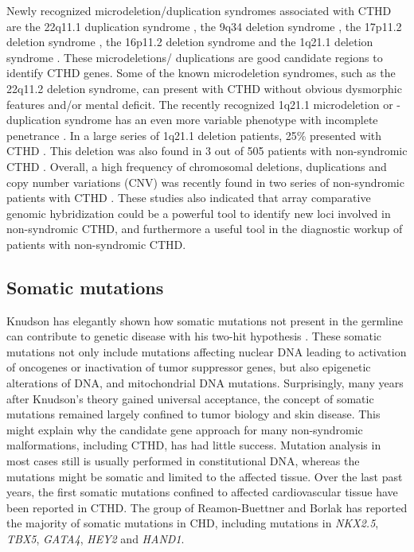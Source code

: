\begin{refsection}
\begin{sloppypar} Newly recognized microdeletion/duplication syndromes associated with CTHD are the 22q11.1 duplication syndrome \cite{wentzel2008clinical}, the 9q34 deletion syndrome \cite{stewart2007chromosome}, the 17p11.2 deletion syndrome \cite{andrieux2007genotype}, the 16p11.2 deletion syndrome \cite{brunetti2008recurrent,hernando2002comparative} and the 1q21.1 deletion syndrome \cite{brunetti2008recurrent,mefford2008recurrent,christiansen2004chromosome}. These microdeletions/ duplications are good candidate regions to identify CTHD genes. Some of the known microdeletion syndromes, such as the 22q11.2 deletion syndrome, can present with CTHD without obvious dysmorphic features and/or mental deficit. The recently recognized 1q21.1 microdeletion or -duplication syndrome has an even more variable phenotype with incomplete penetrance \cite{brunetti2008recurrent,mefford2008recurrent,christiansen2004chromosome}. In a large series of 1q21.1 deletion patients, 25\% presented with CTHD \cite{mefford2008recurrent}. This deletion was also found in 3 out of 505 patients with non-syndromic CTHD \cite{christiansen2004chromosome}. Overall, a high frequency of chromosomal deletions, duplications and copy number variations (CNV) was recently found in two series of non-syndromic patients with CTHD \cite{erdogan2008high,greenway2009novo}. These studies also indicated that array comparative genomic hybridization could be a powerful tool to identify new loci involved in non-syndromic CTHD, and furthermore a useful tool in the diagnostic workup of patients with non-syndromic CTHD. \end{sloppypar}
 
\subsection{Somatic mutations}

Knudson has elegantly shown how somatic mutations not present in the germline can contribute to genetic disease with his two-hit hypothesis \cite{knudson1972mutation}. These somatic mutations not only include mutations affecting nuclear DNA leading to activation of oncogenes or inactivation of tumor suppressor genes, but also epigenetic alterations of DNA, and mitochondrial DNA mutations. Surprisingly, many years after Knudson’s theory gained universal acceptance, the concept of somatic mutations remained largely confined to tumor biology and skin disease. This might explain why the candidate gene approach for many non-syndromic malformations, including CTHD, has had little success. Mutation analysis in most cases still is usually performed in constitutional DNA, whereas the mutations might be somatic and limited to the affected tissue. Over the last past years, the first somatic mutations confined to affected cardiovascular tissue have been reported in CTHD. 
The group of Reamon-Buettner and Borlak \cite{reamon2006bridging,reamon2006hey2,reamon2004tbx5,reamon2004novel,reamon2004somatic,reamon2006somatic,reamon2008loss} has reported the majority of somatic mutations in CHD, including mutations in \textit{NKX2.5}, \textit{TBX5}, \textit{GATA4}, \textit{HEY2} and \textit{HAND1}.


\end{refsection}
